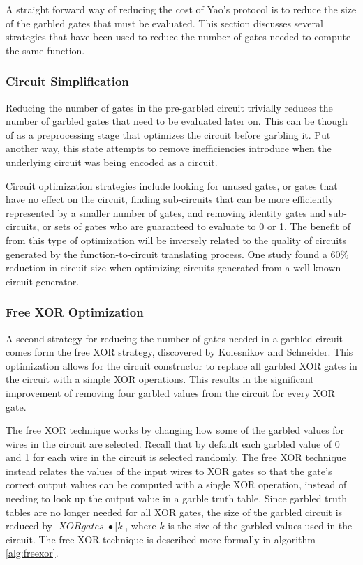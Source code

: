 A straight forward way of reducing the cost of Yao's protocol is to reduce the size of the garbled gates that must be evaluated. This section discusses several strategies that have been used to reduce the number of gates needed to compute the same function.

\subsubsection{Circuit Simplification}

Reducing the number of gates in the pre-garbled circuit trivially reduces the number of garbled gates that need to be evaluated later on.  This can be though of as a preprocessing stage that optimizes the circuit before garbling it.  Put another way, this state attempts to remove inefficiencies introduce when the underlying circuit was being encoded as a circuit.

Circuit optimization strategies include looking for unused gates, or gates that have no effect on the circuit, finding sub-circuits that can be more efficiently represented by a smaller number of gates, and removing identity gates and sub-circuits, or sets of gates who are guaranteed to evaluate to 0 or 1\cite{kreuter2012billion, pinkas2009secure}.  The benefit of from this type of optimization will be inversely related to the quality of circuits generated by the function-to-circuit translating process.  One study\cite{pinkas2009secure} found a 60\% reduction in circuit size when optimizing circuits generated from a well known circuit generator\cite{malkhi2004fairplay}.


\subsubsection{Free XOR Optimization}

A second strategy for reducing the number of gates needed in a garbled circuit comes form the free XOR strategy, discovered by Kolesnikov and Schneider\cite{kolesnikov2008improved}.  This optimization allows for the circuit constructor to replace all garbled XOR gates in the circuit with a simple XOR operations. This results in the significant improvement of removing four garbled values from the circuit for every XOR gate.

The free XOR technique works by changing how some of the garbled values for wires in the circuit are selected. Recall that by default each garbled value of 0 and 1 for each wire in the circuit is selected randomly.  The free XOR technique instead relates the values of the input wires to XOR gates so that the gate's correct output values can be computed with a single XOR operation, instead of needing to look up the output value in a garble truth table. Since garbled truth tables are no longer needed for all XOR gates, the size of the garbled circuit is reduced by $|XOR gates| \bullet |k|$, where $k$ is the size of the garbled values used in the circuit. The free XOR technique is described more formally in algorithm \ref{alg:freexor}.

